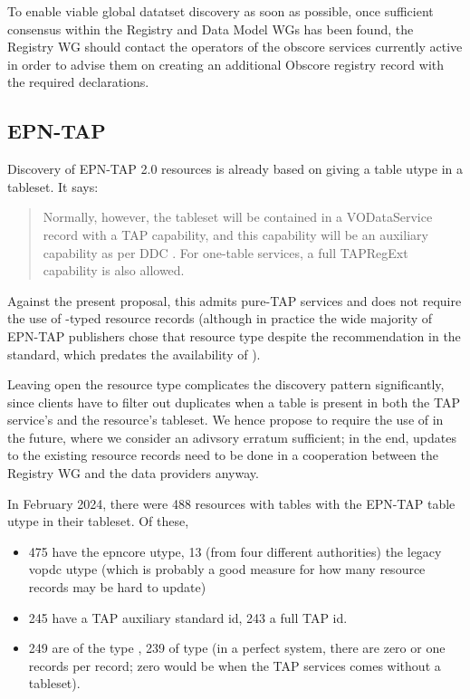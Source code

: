\documentclass[11pt,a4paper]{ivoa}
\begin{document}
To enable viable global datatset discovery as soon as possible, once
sufficient consensus within the Registry and Data Model WGs has been
found, the Registry WG should contact the operators of
the obscore services currently active in order to advise them on
creating an additional Obscore registry record with the required
declarations.

\subsection{EPN-TAP}

Discovery of EPN-TAP 2.0 \citep{2022ivoa.spec.0822E} resources is
already based on giving a table utype in a tableset.  It says:

\begin{quotation}
\noindent Normally, however, the
tableset will be contained in a VODataService 
record with a TAP capability, and this capability will be an auxiliary
capability as per DDC \citep{2019ivoa.spec.0520D}.  For one-table
services, a full TAPRegExt \citep{2012ivoa.spec.0827D} capability is also
allowed.
\end{quotation}

Against the present proposal, this admits pure-TAP services and does not
require the use of -typed resource records
(although in practice the wide majority of EPN-TAP publishers chose
that resource type despite the recommendation in the standard, which
predates the availability of ).


Leaving open the resource type complicates
the discovery pattern significantly, since clients have
to filter out duplicates when a table is present in both the TAP
service's and the resource's tableset.  We hence propose to require the
use of  in the future,
where we consider an adivsory erratum sufficient;
in the end, updates to the existing resource records need to be done in
a cooperation between the Registry WG and the data providers anyway.

In February 2024, there were 488 resources with tables with the EPN-TAP
table utype in their tableset.  Of these,

\begin{itemize}
\item 475 have the epncore utype, 13 (from four different authorities)
the legacy vopdc utype (which is probably a good measure for how many
resource records may be hard to update)
\item 245 have a TAP auxiliary standard id, 243 a full TAP id.
\item 249 are of the type , 239 of type
 (in a perfect system, there are zero or one
 records per  record;
zero would be when the TAP services comes without a tableset).
\end{itemize}
\end{document}

